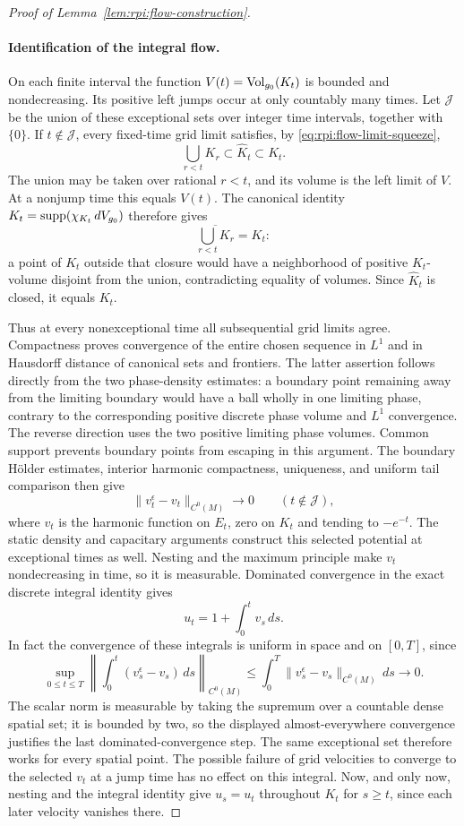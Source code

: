\begin{proof}[Proof of Lemma~\ref{lem:rpi:flow-construction}]
\paragraph{Identification of the integral flow.}
On each finite interval the function $V(t)=\operatorname{Vol}_{g_0}(K_t)$ is
bounded and nondecreasing. Its positive left jumps occur at
only countably many times. Let $\mathcal J$ be the union of
these exceptional sets over integer time intervals, together
with $\{0\}$. If $t\notin\mathcal J$, every fixed-time grid
limit satisfies, by \eqref{eq:rpi:flow-limit-squeeze},
\[
 \bigcup_{r<t}K_r\subset\widehat K_t\subset K_t.
\]
The union may be taken over rational $r<t$, and its volume is
the left limit of $V$. At a nonjump time this equals $V(t)$.
The canonical identity $K_t=\operatorname{supp}(\chi_{K_t}\,dV_{g_0})$
therefore gives
\[
 \overline{\bigcup_{r<t}K_r}=K_t:
\]
a point of $K_t$ outside that closure would have a neighborhood
of positive $K_t$-volume disjoint from the union, contradicting
equality of volumes. Since $\widehat K_t$ is closed, it equals
$K_t$.

Thus at every nonexceptional time all subsequential grid limits
agree. Compactness proves convergence of the entire chosen
sequence in $L^1$ and in Hausdorff distance of canonical sets
and frontiers. The latter assertion follows directly from the
two phase-density estimates: a boundary point remaining away
from the limiting boundary would have a ball wholly in one
limiting phase, contrary to the corresponding positive discrete
phase volume and $L^1$ convergence. The reverse direction uses
the two positive limiting phase volumes. Common support
prevents boundary points from escaping in this argument.
The boundary H\"older estimates, interior harmonic compactness,
uniqueness, and uniform tail comparison then give
\[
 \|v_t^\epsilon-v_t\|_{C^0(M)}\longrightarrow0
 \qquad(t\notin\mathcal J),
\]
where $v_t$ is the harmonic function on $E_t$, zero on $K_t$
and tending to $-e^{-t}$. The static density and capacitary
arguments construct this selected potential at exceptional
times as well. Nesting and the maximum principle make $v_t$
nondecreasing in time, so it is measurable. Dominated
convergence in the exact discrete integral identity gives
\[
 u_t=1+\int_0^t v_s\,ds.
\]
In fact the convergence of these integrals is uniform in space
and on $[0,T]$, since
\[
 \sup_{0\le t\le T}
 \left\|\int_0^t(v_s^\epsilon-v_s)\,ds\right\|_{C^0(M)}
 \le\int_0^T\|v_s^\epsilon-v_s\|_{C^0(M)}\,ds\longrightarrow0.
\]
The scalar norm is measurable by taking the supremum over a
countable dense spatial set; it is bounded by two, so the
displayed almost-everywhere convergence justifies the last
dominated-convergence step. The same exceptional set therefore works
for every spatial point.
The possible failure of grid velocities to converge to the selected
$v_t$ at a jump time has no effect on this integral. Now, and only
now, nesting and the integral identity give
$u_s=u_t$ throughout $K_t$ for $s\ge t$, since each later velocity
vanishes there.


\end{proof}
